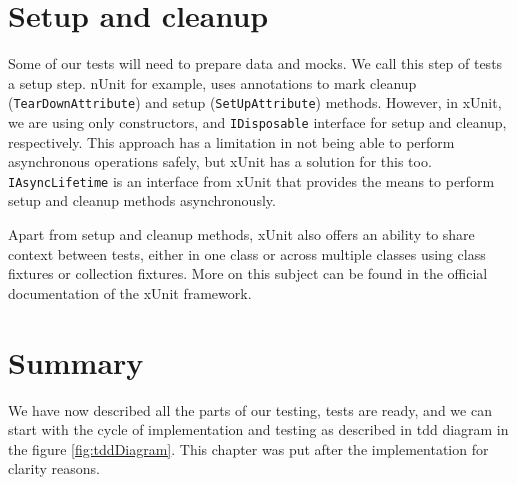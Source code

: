 \section {Setup and cleanup}

Some of our tests will need to prepare data and mocks.
We call this step of tests a setup step.
nUnit for example, uses annotations to mark cleanup (\texttt{TearDownAttribute}) and setup (\texttt{SetUpAttribute}) methods.
However, in xUnit, we are using only constructors, and \texttt{IDisposable} interface for setup and cleanup, respectively.
This approach has a limitation in not being able to perform asynchronous operations safely, but xUnit has a solution for this too.
\texttt{IAsyncLifetime} is an interface from xUnit that provides the means to perform setup and cleanup methods asynchronously.

Apart from setup and cleanup methods, xUnit also offers an ability to share context between tests, either in one class or across multiple classes using class fixtures or collection fixtures. More on this subject can be found in the official documentation of the xUnit framework. \cite{net_foundation_home_nodate}

\section {Summary}

We have now described all the parts of our testing, tests are ready, and we can start with the cycle of implementation and testing as described in \acrshort{tdd} diagram in the figure \ref{fig:tddDiagram}.
This chapter was put after the implementation for clarity reasons.
